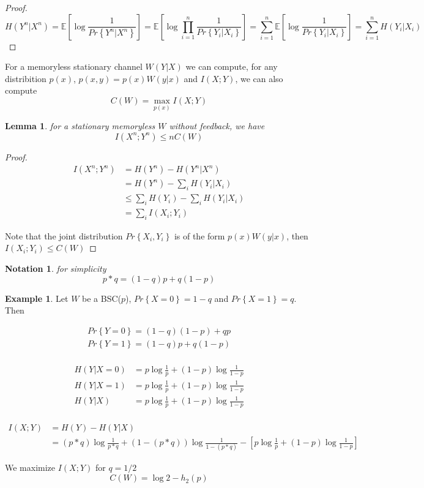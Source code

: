 \documentclass[twoside]{article}
\newtheorem{lemma}[theorem]{Lemma}
\newtheorem{notation}{Notation}
\theoremstyle{definition} %
\newtheorem{example}{Example}
\renewcommand{\Pr}[1]{Pr\left\{#1\right\}}
\newcommand{\Ex}[1]{\mathbb{E}\left[#1\right]}
\begin{document}
\begin{proof}
  \[
    H(Y^n|X^n) = \Ex{\log \frac 1 {\Pr{Y^n|X^n}}}
    = \Ex{\log \prod_{i=1}^n \frac 1 {\Pr{Y_i|X_i}}}
    = \sum_{i=1}^n \Ex{\log \frac 1 {\Pr{Y_i|X_i}}}
    = \sum_{i=1}^n H(Y_i|X_i)
  \]
\end{proof}

For a memoryless stationary channel $W(Y|X)$ we can compute, for any
distribition $p(x)$, $p(x,y) = p(x)W(y|x)$ and $I(X;Y)$, we can also compute
\[
  C(W) = \max_{p(x)} I(X;Y)
\]

\begin{lemma}
  for a stationary memoryless $W$ without feedback, we have
  \[
    I(X^n;Y^n) \leq n C(W)
  \]
\end{lemma}


\begin{proof}
  \begin{align*}
    I(X^n;Y^n) &= H(Y^n) - H(Y^n|X^n)\\
    &= H(Y^n)- \sum_i H(Y_i|X_i)\\
    &\leq \sum_i H(Y_i) - \sum_i H(Y_i|X_i)\\
    &= \sum_i I(X_i;Y_i)
  \end{align*}

  Note that the joint distribution $\Pr{X_i,Y_i}$ is of the form $p(x)W(y|x)$, then $I(X_i;Y_i) \leq C(W)$
\end{proof}

\begin{notation} for simplicity
  \[
    p\ast q = (1-q)p + q(1-p)
  \]
\end{notation}

\begin{example}
  Let $W$ be a BSC($p$), $\Pr{X=0} = 1 - q$ and $\Pr{X=1} = q$. Then

  \begin{align*}
    \Pr{Y=0} = (1-q)(1-p) + qp\\
    \Pr{Y=1} = (1-q)p + q(1-p)\\
  \end{align*}

  \begin{align*}
    H(Y|X=0) &= p \log \frac 1 p + (1-p) \log \frac 1 {1-p}\\
    H(Y|X=1) &= p \log \frac 1 p + (1-p) \log \frac 1 {1-p}\\
    H(Y|X) &= p \log \frac 1 p + (1-p) \log \frac 1 {1-p}\\
  \end{align*}

  \begin{align*}
    I(X;Y) &= H(Y) - H(Y|X)\\
    &=(p\ast q) \log \frac 1 {p\ast q} + (1-(p\ast q))\log \frac 1 {1-(p\ast q)}
    -
    \left[
    p \log \frac 1 p + (1-p) \log \frac 1 {1-p}
    \right]
  \end{align*}

  We maximize $I(X;Y)$ for $q=1/2$
  \[
    C(W) = \log 2 - h_2(p)
  \]

\end{example}
\end{document}
